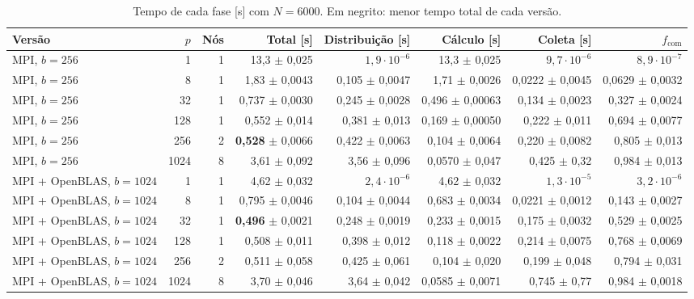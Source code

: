 \documentclass[Portugues]{ic-tese-v3}
\DeclareRobustCommand{\_}{\textunderscore\allowbreak} %
\begin{document}
\begin{table}[H]
\centering\scriptsize
\renewcommand{\arraystretch}{1.05}\setlength{\tabcolsep}{3.5pt}
\begin{tabular}{|l|r|r|r|r|r|r|r|}
\hline
\textbf{Versão} & \textbf{$p$} & \textbf{Nós} & \textbf{Total [s]} & \textbf{Distribuição [s]} & \textbf{Cálculo [s]} & \textbf{Coleta [s]} & \textbf{$f_{\mathrm{com}}$} \\
\hline\hline
MPI, $b=256$ & 1 & 1 & 13,3 $\pm$ 0,025 & $1{,}9\cdot10^{-6}$ & 13,3 $\pm$ 0,025 & $9{,}7\cdot10^{-6}$ & $8{,}9\cdot10^{-7}$ \\ \hline
MPI, $b=256$ & 8 & 1 & 1,83 $\pm$ 0,0043 & 0,105 $\pm$ 0,0047 & 1,71 $\pm$ 0,0026 & 0,0222 $\pm$ 0,0045 & 0,0629 $\pm$ 0,0032 \\ \hline
MPI, $b=256$ & 32 & 1 & 0,737 $\pm$ 0,0030 & 0,245 $\pm$ 0,0028 & 0,496 $\pm$ 0,00063 & 0,134 $\pm$ 0,0023 & 0,327 $\pm$ 0,0024 \\ \hline
MPI, $b=256$ & 128 & 1 & 0,552 $\pm$ 0,014 & 0,381 $\pm$ 0,013 & 0,169 $\pm$ 0,00050 & 0,222 $\pm$ 0,011 & 0,694 $\pm$ 0,0077 \\ \hline
MPI, $b=256$ & 256 & 2 & \textbf{0,528} $\pm$ 0,0066 & 0,422 $\pm$ 0,0063 & 0,104 $\pm$ 0,0064 & 0,220 $\pm$ 0,0082 & 0,805 $\pm$ 0,013 \\ \hline
MPI, $b=256$ & 1024 & 8 & 3,61 $\pm$ 0,092 & 3,56 $\pm$ 0,096 & 0,0570 $\pm$ 0,047 & 0,425 $\pm$ 0,32 & 0,984 $\pm$ 0,013 \\ \hline\hline
MPI + OpenBLAS, $b=1024$ & 1 & 1 & 4,62 $\pm$ 0,032 & $2{,}4\cdot10^{-6}$ & 4,62 $\pm$ 0,032 & $1{,}3\cdot10^{-5}$ & $3{,}2\cdot10^{-6}$ \\ \hline
MPI + OpenBLAS, $b=1024$ & 8 & 1 & 0,795 $\pm$ 0,0046 & 0,104 $\pm$ 0,0044 & 0,683 $\pm$ 0,0034 & 0,0221 $\pm$ 0,0012 & 0,143 $\pm$ 0,0027 \\ \hline
MPI + OpenBLAS, $b=1024$ & 32 & 1 & \textbf{0,496} $\pm$ 0,0021 & 0,248 $\pm$ 0,0019 & 0,233 $\pm$ 0,0015 & 0,175 $\pm$ 0,0032 & 0,529 $\pm$ 0,0025 \\ \hline
MPI + OpenBLAS, $b=1024$ & 128 & 1 & 0,508 $\pm$ 0,011 & 0,398 $\pm$ 0,012 & 0,118 $\pm$ 0,0022 & 0,214 $\pm$ 0,0075 & 0,768 $\pm$ 0,0069 \\ \hline
MPI + OpenBLAS, $b=1024$ & 256 & 2 & 0,511 $\pm$ 0,058 & 0,425 $\pm$ 0,061 & 0,104 $\pm$ 0,020 & 0,199 $\pm$ 0,048 & 0,794 $\pm$ 0,031 \\ \hline
MPI + OpenBLAS, $b=1024$ & 1024 & 8 & 3,70 $\pm$ 0,046 & 3,64 $\pm$ 0,042 & 0,0585 $\pm$ 0,0071 & 0,745 $\pm$ 0,77 & 0,984 $\pm$ 0,0018 \\ \hline
\end{tabular}
\caption{Tempo de cada fase [s] com $N=6000$. Em negrito: menor tempo total de cada versão.}
\label{tab:fases}
\end{table}
\end{document}

